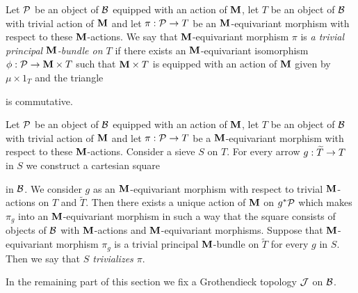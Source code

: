 \begin{definition}
Let ${\mathcal P}$ be an object of ${\mathcal B}$ equipped with an action of $\mathbf{M}$, let $T$ be an object of ${\mathcal B}$ with trivial action of $\mathbf{M}$ and let $\pi:{\mathcal P}\rightarrow T$ be an $\mathbf{M}$-equivariant morphism with respect to these $\mathbf{M}$-actions. We say that $\mathbf{M}$-equivariant morphism $\pi$ is \textit{a trivial principal $\mathbf{M}$-bundle on $T$} if there exists an $\mathbf{M}$-equivariant isomorphism $\phi:{\mathcal P}\rightarrow \mathbf{M}\times T$ such that $\mathbf{M}\times T$ is equipped with an action of $\mathbf{M}$ given by $\mu\times 1_T$ and the triangle
\begin{center}
\end{center}
is commutative.
\end{definition}

\begin{definition}
Let ${\mathcal P}$ be an object of ${\mathcal B}$ equipped with an action of $\mathbf{M}$, let $T$ be an object of ${\mathcal B}$ with trivial action of $\mathbf{M}$ and let $\pi:{\mathcal P}\rightarrow T$ be a $\mathbf{M}$-equivariant morphism with respect to these $\mathbf{M}$-actions. Consider a sieve $S$ on $T$. For every arrow $g:\widetilde{T}\rightarrow T$ in $S$ we construct a cartesian square
\begin{center}
\end{center}
in ${\mathcal B}$. We consider $g$ as an $\mathbf{M}$-equivariant morphism with respect to trivial $\mathbf{M}$-actions on $T$ and $\widetilde{T}$. Then there exists a unique action of $\mathbf{M}$ on $g^*{\mathcal P}$ which makes $\pi_g$ into an $\mathbf{M}$-equivariant morphism in such a way that the square consists of objects of ${\mathcal B}$ with $\mathbf{M}$-actions and $\mathbf{M}$-equivariant morphisms. Suppose that $\mathbf{M}$-equivariant morphism $\pi_g$ is a trivial principal $\mathbf{M}$-bundle on $\widetilde{T}$ for every $g$ in $S$. Then we say that \textit{$S$ trivializes $\pi$}.
\end{definition}
\noindent
In the remaining part of this section we fix a Grothendieck topology ${\mathcal J}$ on ${\mathcal B}$.


